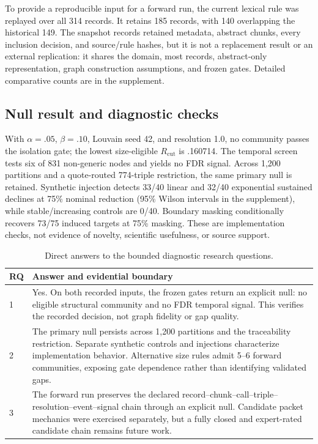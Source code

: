 \documentclass[runningheads]{llncs}
\begin{document}
To provide a reproducible input for a forward run, the current lexical rule was replayed over all 314 records. It retains 185 records, with 140 overlapping the historical 149. The snapshot records retained metadata, abstract chunks, every inclusion decision, and source/rule hashes, but it is not a replacement result or an external replication: it shares the domain, most records, abstract-only representation, graph construction assumptions, and frozen gates. Detailed comparative counts are in the supplement.

\subsection{Null result and diagnostic checks}
With $\alpha=.05$, $\beta=.10$, Louvain seed 42, and resolution 1.0, no community passes the isolation gate; the lowest size-eligible $R_{\mathrm{cut}}$ is .160714. The temporal screen tests six of 831 non-generic nodes and yields no FDR signal. Across 1,200 partitions and a quote-routed 774-triple restriction, the same primary null is retained. Synthetic injection detects 33/40 linear and 32/40 exponential sustained declines at 75\% nominal reduction (95\% Wilson intervals in the supplement), while stable/increasing controls are 0/40. Boundary masking conditionally recovers 73/75 induced targets at 75\% masking. These are implementation checks, not evidence of novelty, scientific usefulness, or source support.

\begin{table}[t]
\caption{Direct answers to the bounded diagnostic research questions.}
\label{tab:rq-answers}
\centering\scriptsize
\begin{tabular}{p{.55cm}p{6.0cm}}
\toprule
RQ & Answer and evidential boundary\\
\midrule
1 & Yes. On both recorded inputs, the frozen gates return an explicit null: no eligible structural community and no FDR temporal signal. This verifies the recorded decision, not graph fidelity or gap quality.\\
2 & The primary null persists across 1,200 partitions and the traceability restriction. Separate synthetic controls and injections characterize implementation behavior. Alternative size rules admit 5--6 forward communities, exposing gate dependence rather than identifying validated gaps.\\
3 & The forward run preserves the declared record--chunk--call--triple--resolution--event--signal chain through an explicit null. Candidate packet mechanics were exercised separately, but a fully closed and expert-rated candidate chain remains future work.\\
\bottomrule
\end{tabular}
\end{table}
\end{document}
